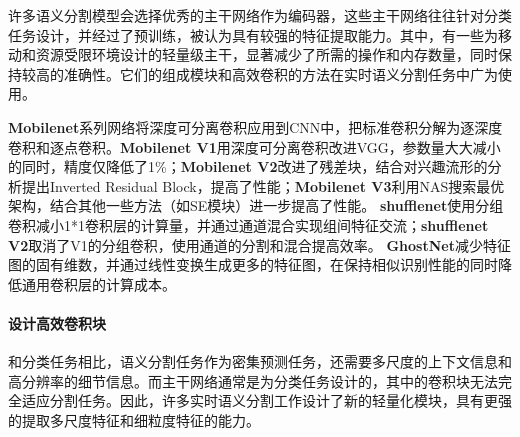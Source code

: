 \documentclass[11pt]{article}
\begin{document}
许多语义分割模型会选择优秀的主干网络作为编码器，这些主干网络往往针对分类任务设计，并经过了预训练，被认为具有较强的特征提取能力。其中，有一些为移动和资源受限环境设计的轻量级主干，显著减少了所需的操作和内存数量，同时保持较高的准确性。它们的组成模块和高效卷积的方法在实时语义分割任务中广为使用。

\textbf{Mobilenet}\cite{mo1,ref11,ref12}系列网络将深度可分离卷积应用到CNN中，把标准卷积分解为逐深度卷积和逐点卷积。\textbf{Mobilenet V1}\cite{mo1}用深度可分离卷积改进VGG，参数量大大减小的同时，精度仅降低了1\%；\textbf{Mobilenet V2}\cite{ref11}改进了残差块，结合对兴趣流形的分析提出Inverted Residual Block，提高了性能；\textbf{Mobilenet V3}\cite{ref12}利用NAS搜索最优架构，结合其他一些方法（如SE模块）进一步提高了性能。
\textbf{shufflenet}\cite{ref10}使用分组卷积减小1*1卷积层的计算量，并通过通道混合实现组间特征交流；\textbf{shufflenet V2}\cite{ref13}取消了V1的分组卷积，使用通道的分割和混合提高效率。
\textbf{GhostNet}\cite{ref14}减少特征图的固有维数，并通过线性变换生成更多的特征图，在保持相似识别性能的同时降低通用卷积层的计算成本。

\paragraph{设计高效卷积块}

和分类任务相比，语义分割任务作为密集预测任务，还需要多尺度的上下文信息和高分辨率的细节信息。而主干网络通常是为分类任务设计的，其中的卷积块无法完全适应分割任务。因此，许多实时语义分割工作设计了新的轻量化模块，具有更强的提取多尺度特征和细粒度特征的能力。
\end{document}
